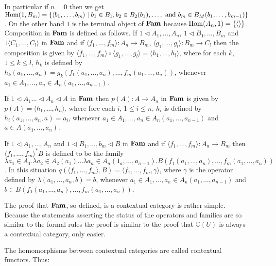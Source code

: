 In particular if \(n=0\) then we get \(\operatorname{Hom}(1, B_m) = \{\langle b_1, \ldots, b_m \rangle \mid b_1 \in B_1, b_2 \in B_2(b_1), \ldots, \text{ and } b_m \in B_M(b_1, \ldots, b_{m-1})\}\).
%
On the other hand \(1\) is the terminal object of \(\mathbf{Fam}\) because \(\operatorname{Hom}(A_n, 1) = \{\langle  \rangle\}\).
%
%
Composition in \(\mathbf{Fam}\) is defined as follows. If \(1 \triangleleft A_1, \ldots, A_n\), \(1 \triangleleft B_1, \ldots, B_m\) and \(1 \langle C_1, \ldots, C_l \rangle\) in \(\mathbf{Fam}\) and if \(\langle f_1, \ldots, f_m \rangle : A_n \rightarrow B_m\), \(\langle g_1, \ldots, g_l \rangle : B_m \rightarrow C_l\) then the composition is given by \(\langle f_1, \ldots, f_m \rangle \circ \langle g_1, \ldots, g_l \rangle = \langle h_1, \ldots, h_l \rangle\), where for each \(k\), \(1 \leq k \leq l\), \(h_k\) is defined by \(h_k(a_1, \ldots, a_n) = g_k(f_1(a_1, \ldots, a_n), \ldots, f_m(a_1, \ldots, a_n))\), whenever \(a_1 \in A_1, \ldots, a_n \in A_n(a_1, \ldots, a_{n-1})\).


If \(1 \triangleleft A_1 \ldots \triangleleft A_n \triangleleft A\) in \(\mathbf{Fam}\) then \(p(A):A \rightarrow A_n\) in \(\mathbf{Fam}\) is given by \(p(A) = \langle h_1, \ldots, h_n \rangle\), where fore each \(i\), \(1 \leq i \leq n\), \(h_i\) is defined by \(h_i(a_1, \ldots, a_n, a) = a_i\), whenever \(a_1 \in A_1, \ldots, a_n \in A_n(a_1, \ldots, a_{n-1})\) and \(a \in A(a_1, \ldots, a_n)\).

If \(1 \triangleleft A_1, \ldots, A_n\) and \(1 \triangleleft B_1, \ldots, b_m \triangleleft B\) in \(\mathbf{Fam}\) and if \(\langle f_1, \ldots, f_m \rangle:A_n \rightarrow B_m\) then \(\langle f_1, \ldots, f_m \rangle^*B\) is defined to be the family \(\lambda a_1 \in A_1. \lambda a_2 \in A_2(a_1) \ldots \lambda a_n \in A_n(1_a, \ldots, a_{n-1}). B(f_1(a_1, \ldots, a_n), \ldots, f_m(a_1, \ldots, a_n))\).
%
In this situation \(q(\langle f_1, \ldots, f_m \rangle, B) = \langle f_1, \ldots, f_m, \gamma \rangle\), where \(\gamma\) is the operator defined by \(\lambda(a_1, \ldots, a_n, b) = b\), whenever \(a_1 \in A_1, \ldots, a_n \in A_n(a_1, \ldots, a_{n-1})\) and \(b \in B(f_1(a_1, \ldots, a_n), \ldots, f_m(a_1, \ldots, a_n))\).

The proof that \(\mathbf{Fam}\), so defined, is a contextual category is rather simple.
%
Because the statements asserting the status of the operators and families are so similar to the formal rules the proof is similar to the proof that \(\mathbb C(U)\) is always a contextual category, only easier.

The homomorphisms between contextual categories are called contextual functors. Thus:

